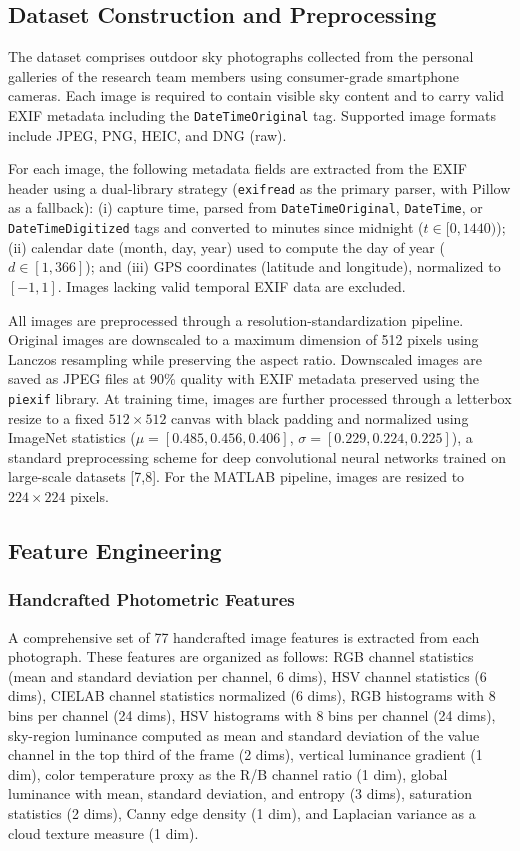 \documentclass[9pt, a4paper, twocolumn]{article}
\begin{document}
\subsection{Dataset Construction and Preprocessing}

The dataset comprises outdoor sky photographs collected from the personal galleries of the research team members using consumer-grade smartphone cameras. Each image is required to contain visible sky content and to carry valid EXIF metadata including the \texttt{DateTimeOriginal} tag. Supported image formats include JPEG, PNG, HEIC, and DNG (raw).

For each image, the following metadata fields are extracted from the EXIF header using a dual-library strategy (\texttt{exifread} as the primary parser, with Pillow as a fallback): (i) capture time, parsed from \texttt{DateTimeOriginal}, \texttt{DateTime}, or \texttt{DateTimeDigitized} tags and converted to minutes since midnight ($t \in [0, 1440)$); (ii) calendar date (month, day, year) used to compute the day of year ($d \in [1, 366]$); and (iii) GPS coordinates (latitude and longitude), normalized to $[-1, 1]$. Images lacking valid temporal EXIF data are excluded.

All images are preprocessed through a resolution-standardization pipeline. Original images are downscaled to a maximum dimension of 512 pixels using Lanczos resampling while preserving the aspect ratio. Downscaled images are saved as JPEG files at 90\% quality with EXIF metadata preserved using the \texttt{piexif} library. At training time, images are further processed through a letterbox resize to a fixed $512 \times 512$ canvas with black padding and normalized using ImageNet statistics ($\mu = [0.485, 0.456, 0.406]$, $\sigma = [0.229, 0.224, 0.225]$), a standard preprocessing scheme for deep convolutional neural networks trained on large-scale datasets [7,8]. For the MATLAB pipeline, images are resized to $224 \times 224$ pixels.

\subsection{Feature Engineering}

\subsubsection{Handcrafted Photometric Features}

A comprehensive set of 77 handcrafted image features is extracted from each photograph. These features are organized as follows: RGB channel statistics (mean and standard deviation per channel, 6 dims), HSV channel statistics (6 dims), CIELAB channel statistics normalized (6 dims), RGB histograms with 8 bins per channel (24 dims), HSV histograms with 8 bins per channel (24 dims), sky-region luminance computed as mean and standard deviation of the value channel in the top third of the frame (2 dims), vertical luminance gradient (1 dim), color temperature proxy as the R/B channel ratio (1 dim), global luminance with mean, standard deviation, and entropy (3 dims), saturation statistics (2 dims), Canny edge density (1 dim), and Laplacian variance as a cloud texture measure (1 dim).
\end{document}
